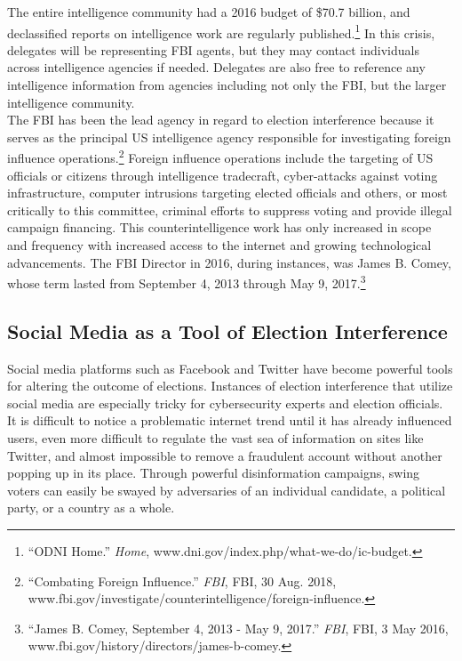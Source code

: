 \documentclass[10pt, letterpaper]{article}
\begin{document}
The entire intelligence community had a 2016 budget of \$70.7 billion,
and declassified reports on intelligence work are regularly
published.\footnote{``ODNI Home.'' \emph{Home},
  www.dni.gov/index.php/what-we-do/ic-budget.} In this crisis, delegates
will be representing FBI agents, but they may contact individuals across
intelligence agencies if needed. Delegates are also free to reference
any intelligence information from agencies including not only the FBI,
but the larger intelligence community. \\

The FBI has been the lead agency in regard to election interference
because it serves as the principal US intelligence agency responsible
for investigating foreign influence operations.\footnote{``Combating
  Foreign Influence.'' \emph{FBI}, FBI, 30 Aug. 2018,
  www.fbi.gov/investigate/counterintelligence/foreign-influence.}
Foreign influence operations include the targeting of US officials or
citizens through intelligence tradecraft, cyber-attacks against voting
infrastructure, computer intrusions targeting elected officials and
others, or most critically to this committee, criminal efforts to
suppress voting and provide illegal campaign financing. This
counterintelligence work has only increased in scope and frequency with
increased access to the internet and growing technological advancements.
The FBI Director in 2016, during instances, was James B. Comey, whose
term lasted from September 4, 2013 through May 9, 2017.\footnote{``James
  B. Comey, September 4, 2013 - May 9, 2017.'' \emph{FBI}, FBI, 3 May
  2016, www.fbi.gov/history/directors/james-b-comey.} \\

\subsection{Social Media as a Tool of Election Interference}

Social media platforms such as Facebook and Twitter have become powerful
tools for altering the outcome of elections. Instances of election
interference that utilize social media are especially tricky for
cybersecurity experts and election officials. It is difficult to notice
a problematic internet trend until it has already influenced users, even
more difficult to regulate the vast sea of information on sites like
Twitter, and almost impossible to remove a fraudulent account without
another popping up in its place. Through powerful disinformation
campaigns, swing voters can easily be swayed by adversaries of an
individual candidate, a political party, or a country as a whole. \\
\end{document}
